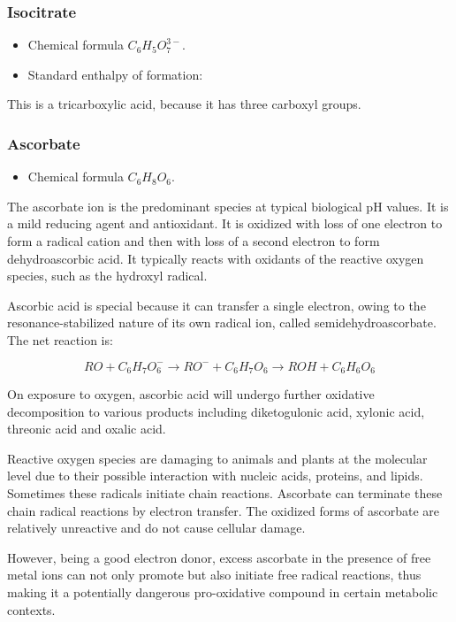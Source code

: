 \documentclass{article}
\begin{document}
\subsubsection{Isocitrate}
\begin{itemize}
    \item Chemical formula $C_6H_5O_7^{3-}$.
    \item Standard enthalpy of formation:
\end{itemize}
This is a tricarboxylic acid, because it has three carboxyl groups.

\subsubsection{Ascorbate}
\begin{itemize}
    \item Chemical formula $C_6H_8O_6$.
\end{itemize}
The ascorbate ion is the predominant species at typical biological pH values. It is a mild
reducing agent and antioxidant. It is oxidized with loss of one electron to form a radical
cation and then with loss of a second electron to form dehydroascorbic acid. It typically
reacts with oxidants of the reactive oxygen species, such as the hydroxyl radical.

Ascorbic acid is special because it can transfer a single electron, owing to the
resonance-stabilized nature of its own radical ion, called semidehydroascorbate. The net
reaction is:

\[
    RO + C_6H_7O_6^- \rightarrow RO^− + C_6H_7O_6 \rightarrow ROH + C_6H_6O_6
\]

On exposure to oxygen, ascorbic acid will undergo further oxidative decomposition to
various products including diketogulonic acid, xylonic acid, threonic acid and oxalic
acid.

Reactive oxygen species are damaging to animals and plants at the molecular level due to
their possible interaction with nucleic acids, proteins, and lipids. Sometimes these
radicals initiate chain reactions. Ascorbate can terminate these chain radical reactions
by electron transfer. The oxidized forms of ascorbate are relatively unreactive and do not
cause cellular damage.

However, being a good electron donor, excess ascorbate in the presence of free metal ions
can not only promote but also initiate free radical reactions, thus making it a
potentially dangerous pro-oxidative compound in certain metabolic contexts.
\end{document}
